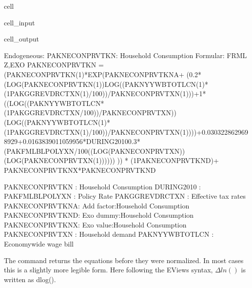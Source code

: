 \documentclass[letterpaper,10pt,english]{jupyterBook}
\begin{document}
\begin{sphinxuseclass}{cell}\begin{sphinxVerbatimInput}

\begin{sphinxuseclass}{cell_input}
\begin{sphinxVerbatim}[commandchars=\\\{\}]
\end{sphinxVerbatim}

\end{sphinxuseclass}\end{sphinxVerbatimInput}
\begin{sphinxVerbatimOutput}

\begin{sphinxuseclass}{cell_output}
\begin{sphinxVerbatim}[commandchars=\\\{\}]
Endogeneous: PAKNECONPRVTKN: Household Consumption
Formular: FRML \PYGZlt{}Z,EXO\PYGZgt{} PAKNECONPRVTKN = (PAKNECONPRVTKN(\PYGZhy{}1)*EXP(\PYGZhy{}PAKNECONPRVTKN\PYGZus{}A+ (\PYGZhy{}0.2*(LOG(PAKNECONPRVTKN(\PYGZhy{}1))\PYGZhy{}LOG((PAKNYYWBTOTLCN(\PYGZhy{}1)*(1\PYGZhy{}PAKGGREVDRCTXN(\PYGZhy{}1)/100))/PAKNECONPRVTXN(\PYGZhy{}1)))+1*((LOG((PAKNYYWBTOTLCN*(1\PYGZhy{}PAKGGREVDRCTXN/100))/PAKNECONPRVTXN))\PYGZhy{}(LOG((PAKNYYWBTOTLCN(\PYGZhy{}1)*(1\PYGZhy{}PAKGGREVDRCTXN(\PYGZhy{}1)/100))/PAKNECONPRVTXN(\PYGZhy{}1))))+0.0303228629698929+0.0163839011059956*DURING\PYGZus{}2010\PYGZhy{}0.3*(PAKFMLBLPOLYXN/100\PYGZhy{}((LOG(PAKNECONPRVTXN))\PYGZhy{}(LOG(PAKNECONPRVTXN(\PYGZhy{}1)))))) )) * (1\PYGZhy{}PAKNECONPRVTKN\PYGZus{}D)+ PAKNECONPRVTKN\PYGZus{}X*PAKNECONPRVTKN\PYGZus{}D  \PYGZdl{}

PAKNECONPRVTKN  : Household Consumption
DURING\PYGZus{}2010     : 
PAKFMLBLPOLYXN  : Policy Rate
PAKGGREVDRCTXN  : Effective tax rates
PAKNECONPRVTKN\PYGZus{}A: Add factor:Household Consumption
PAKNECONPRVTKN\PYGZus{}D: Exo dummy:Household Consumption
PAKNECONPRVTKN\PYGZus{}X: Exo value:Household Consumption
PAKNECONPRVTXN  : Household demand
PAKNYYWBTOTLCN  : Economy\PYGZhy{}wide wage bill
\end{sphinxVerbatim}

\end{sphinxuseclass}\end{sphinxVerbatimOutput}

\end{sphinxuseclass}
\sphinxAtStartPar
The  command returns the equations before they were normalized. In most cases this is a slightly more legible form. Here following the EViews syntax, \(\Delta ln()\) is written as dlog().
\end{document}
